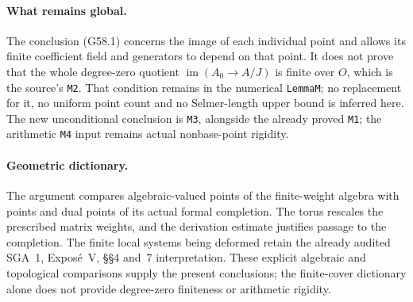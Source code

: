\paragraph{What remains global.}
The conclusion (G58.1) concerns the image
of each individual point and allows its
finite coefficient field and generators to
depend on that point.
It does not prove that the whole degree-zero
quotient $\operatorname{im}(A_0\to A/J)$
is finite over $O$, which is the source's
\texttt{M2}.
That condition remains in the numerical
\texttt{LemmaM}; no replacement for it, no
uniform point count and no Selmer-length
upper bound is inferred here.
The new unconditional conclusion is
\texttt{M3}, alongside the already proved
\texttt{M1}; the arithmetic \texttt{M4}
input remains actual nonbase-point rigidity.

\paragraph{Geometric dictionary.}
The argument compares algebraic-valued points
of the finite-weight algebra with points and
dual points of its actual formal completion.
The torus rescales the prescribed matrix
weights, and the derivation estimate justifies
passage to the completion.
The finite local systems being deformed
retain the already audited SGA~1,
Expos\'e~V, \S\S4 and~7 interpretation.
These explicit algebraic and topological
comparisons supply the present conclusions;
the finite-cover dictionary alone does not
provide degree-zero finiteness or arithmetic
rigidity.
